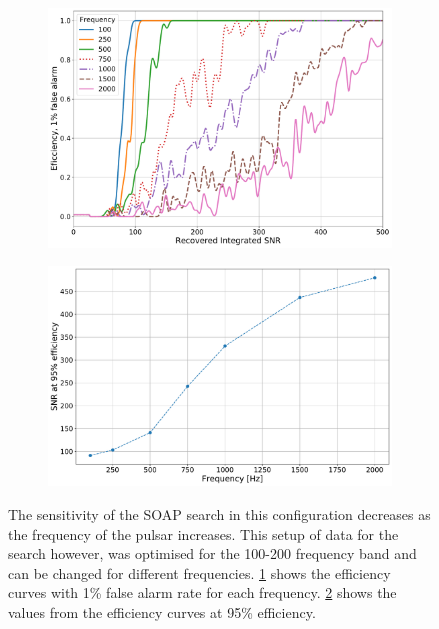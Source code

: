 \begin{figure}
	
	\begin{subfigure}[h]{0.9\linewidth}
			\centering
			\includegraphics[width=\linewidth]{C3_soap/snr_freq_eff.pdf}
			\caption{}
			\label{soap:sens:eff}
	\end{subfigure}

	\begin{subfigure}[h]{0.9\linewidth}
		\centering
		\includegraphics[width=\linewidth]{C3_soap/snr_with_freq.pdf}
		\caption{}
		\label{soap:sens:snrfreq}
	\end{subfigure}

\caption[How the sensitivity of SOAP changes with frequency.]{The sensitivity of the SOAP search in this configuration decreases as the frequency of the pulsar increases. This setup of data for the search however, was optimised for the 100-200 frequency band and can be changed for different frequencies. \ref{soap:sens:eff} shows the efficiency curves with 1\% false alarm rate for each frequency. \ref{soap:sens:snrfreq} shows the values from the efficiency curves at 95\% efficiency.}
\label{soap:sens:results}

\end{figure}

